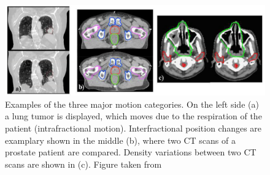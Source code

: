 \begin{figure}[H]
\begin{center}
\includegraphics[scale=0.43]{./teile/introduction/motion_examples.png}
\caption{Examples of the three major motion categories. On the left side (a) a lung tumor is displayed, which moves due to the respiration 
of the patient (intrafractional motion). Interfractional position changes are examplary shown in the middle (b), where two CT scans of a 
prostate patient are compared. Density variations between two CT scans are shown in (c). Figure taken from \cite{Eng11}}
\label{motion}
\end{center}
\end{figure}

